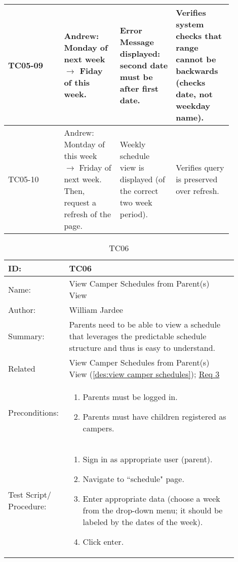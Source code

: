 \documentclass[11pt]{article}
\begin{document}
\begin{center}
\begin{longtable}{|p{0.22\linewidth}|p{0.22\linewidth}|p{0.22\linewidth}|p{0.22\linewidth}|}
	TC05-09 & Andrew: Monday of next week $\longrightarrow$ Fiday of this week. & Error Message displayed: second date must be after first date. & Verifies system checks that range cannot be backwards (checks date, not weekday name).\vspace*{1em}\\\hline
	TC05-10 & Andrew: Montday of this week $\longrightarrow$ Friday of next week. Then, request a refresh of the page. & Weekly schedule view is displayed (of the correct two week period). & Verifies query is preserved over refresh.\vspace*{1em}\\\hline
\end{longtable}
\end{center}
\clearpage


\begin{table}[H]
\begin{center}
\caption{TC06}
\label{TC06}
\begin{tabular}{p{0.20\linewidth}p{0.70\linewidth}}
	ID: & TC06\\\hline
	Name: & View Camper Schedules from Parent(s) View \\\hline
	Author: & William Jardee\\\hline
	Summary: & Parents need to be able to view a schedule that leverages the predictable schedule structure and thus is easy to understand. \\\hline
	Related \hspace{5em} & View Camper Schedules from Parent(s) View (\cref{des:view camper schedules}); \hyperlink{Req3}{Req 3}\\\hline
	Preconditions:& \begin{enumerate}[topsep=0pt] 
		\item Parents must be logged in.
		\item Parents must have children registered as campers.
	\end{enumerate}\\\hline
	Test Script/ Procedure: & \begin{enumerate}[topsep=0pt]
		\item Sign in as appropriate user (parent).
		\item Navigate to ``schedule" page.
		\item Enter appropriate data (choose a week from the drop-down menu; it should be labeled by the dates of the week).
		\item Click enter.
	\end{enumerate}\\\hline

\end{tabular}
\end{center}
\end{table}
\end{document}
